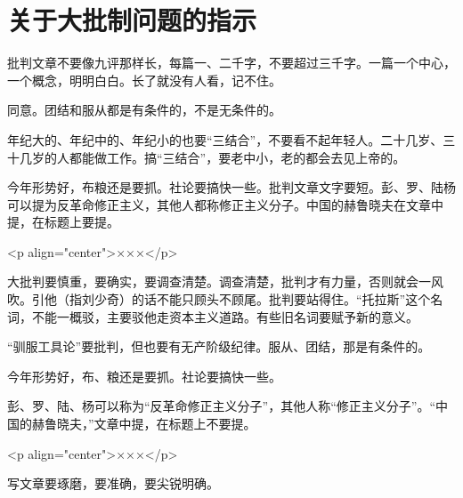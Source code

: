\section[关于大批制问题的指示（一九六七年五月二日）]{关于大批制问题的指示}


批判文章不要像九评那样长，每篇一、二千字，不要超过三千字。一篇一个中心，一个概念，明明白白。长了就没有人看，记不住。

同意。团结和服从都是有条件的，不是无条件的。

年纪大的、年纪中的、年纪小的也要“三结合”，不要看不起年轻人。二十几岁、三十几岁的人都能做工作。搞“三结合”，要老中小，老的都会去见上帝的。

今年形势好，布粮还是要抓。社论要搞快一些。批判文章文字要短。彭、罗、陆杨可以提为反革命修正主义，其他人都称修正主义分子。中国的赫鲁晓夫在文章中提，在标题上要提。

<p align="center">×××</p>

大批判要慎重，要确实，要调查清楚。调查清楚，批判才有力量，否则就会一风吹。引他（指刘少奇）的话不能只顾头不顾尾。批判要站得住。“托拉斯”这个名词，不能一概驳，主要驳他走资本主义道路。有些旧名词要赋予新的意义。

“驯服工具论”要批判，但也要有无产阶级纪律。服从、团结，那是有条件的。

今年形势好，布、粮还是要抓。社论要搞快一些。

彭、罗、陆、杨可以称为“反革命修正主义分子”，其他人称“修正主义分子”。“中国的赫鲁晓夫，”文章中提，在标题上不要提。

<p align="center">×××</p>

写文章要琢磨，要准确，要尖锐明确。



